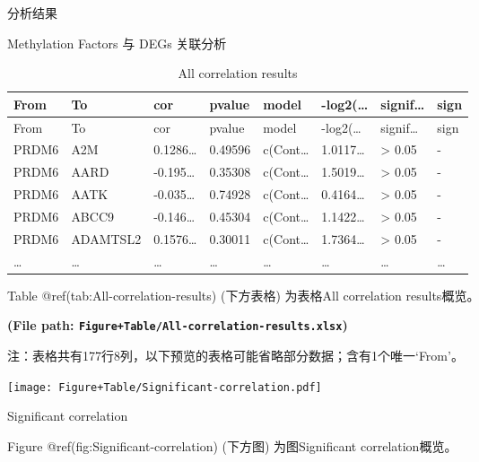\documentclass[
  ignorenonframetext,
]{beamer}
\begin{document}
\begin{frame}[fragile]{分析结果}
\begin{block}{Methylation Factors 与 DEGs 关联分析}
\begin{longtable}[]{@{}llllllll@{}}
\caption{All correlation results}\tabularnewline
\toprule
From & To & cor & pvalue & model & -log2(\ldots{} & signif\ldots{} &
sign\tabularnewline
\midrule
\endfirsthead
\toprule
From & To & cor & pvalue & model & -log2(\ldots{} & signif\ldots{} &
sign\tabularnewline
\midrule
\endhead
PRDM6 & A2M & 0.1286\ldots{} & 0.49596 & c(Cont\ldots{} & 1.0117\ldots{}
& \textgreater{} 0.05 & -\tabularnewline
PRDM6 & AARD & -0.195\ldots{} & 0.35308 & c(Cont\ldots{} &
1.5019\ldots{} & \textgreater{} 0.05 & -\tabularnewline
PRDM6 & AATK & -0.035\ldots{} & 0.74928 & c(Cont\ldots{} &
0.4164\ldots{} & \textgreater{} 0.05 & -\tabularnewline
PRDM6 & ABCC9 & -0.146\ldots{} & 0.45304 & c(Cont\ldots{} &
1.1422\ldots{} & \textgreater{} 0.05 & -\tabularnewline
PRDM6 & ADAMTSL2 & 0.1576\ldots{} & 0.30011 & c(Cont\ldots{} &
1.7364\ldots{} & \textgreater{} 0.05 & -\tabularnewline
\ldots{} & \ldots{} & \ldots{} & \ldots{} & \ldots{} & \ldots{} &
\ldots{} & \ldots{}\tabularnewline
\bottomrule
\end{longtable}

Table @ref(tab:All-correlation-results) (下方表格) 为表格All correlation
results概览。

\textbf{(File path: \texttt{Figure+Table/All-correlation-results.xlsx})}

\begin{center}\begin{tcolorbox}[colback=gray!10, colframe=gray!50, width=0.9\linewidth, arc=1mm, boxrule=0.5pt]注：表格共有177行8列，以下预览的表格可能省略部分数据；含有1个唯一`From'。
\end{tcolorbox}
\end{center}

\begin{center}\vspace{1.5cm}\end{center}

\begin{center}\vspace{1.5cm}\end{center}
\def\@captype{figure}
\begin{center}
\texttt{[image: Figure+Table/Significant-correlation.pdf]}
\caption{Significant correlation}\label{fig:Significant-correlation}
\end{center}

Figure @ref(fig:Significant-correlation) (下方图) 为图Significant
correlation概览。


\end{block}
\end{frame}
\end{document}
